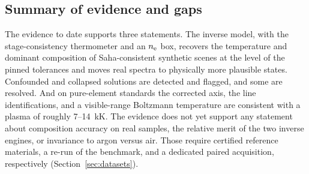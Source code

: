 \subsection{Summary of evidence and gaps}

The evidence to date supports three statements. The inverse model, with the stage-consistency thermometer and an $n_{\mathrm{e}}$ box, recovers the temperature and dominant composition of Saha-consistent synthetic scenes at the level of the pinned tolerances and moves real spectra to physically more plausible states. Confounded and collapsed solutions are detected and flagged, and some are resolved. And on pure-element standards the corrected axis, the line identifications, and a visible-range Boltzmann temperature are consistent with a plasma of roughly 7--\SI{14}{\kilo\kelvin}. The evidence does not yet support any statement about composition accuracy on real samples, the relative merit of the two inverse engines, or invariance to argon versus air. Those require certified reference materials, a re-run of the benchmark, and a dedicated paired acquisition, respectively (Section~\ref{sec:datasets}).
